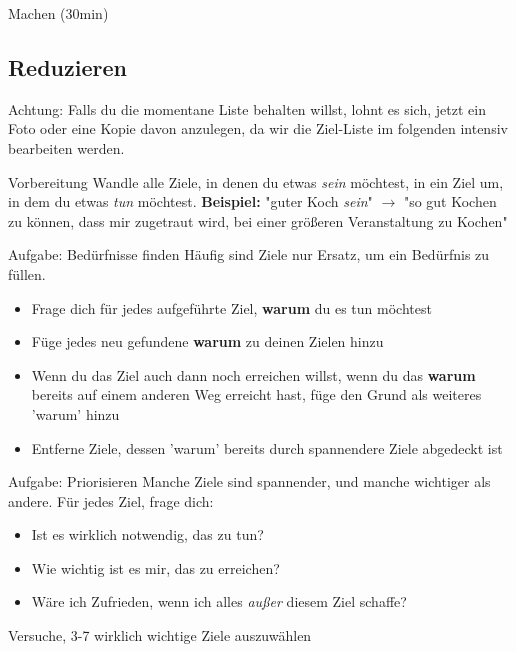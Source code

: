 \addtocounter{framenumber}{1}
\begin{frame}[standout]
    Machen (30min)
\end{frame}


\subsection{Reduzieren}

\addtocounter{framenumber}{1}
\begin{frame}[standout]
    \LARGE
    Achtung: Falls du die momentane Liste behalten willst, lohnt es sich, jetzt
    ein Foto oder eine Kopie davon anzulegen, da wir die Ziel-Liste im
    folgenden intensiv bearbeiten werden.
\end{frame}

\begin{frame}[c]{Vorbereitung}
    \Large
    Wandle alle Ziele, in denen du etwas {\em sein} möchtest, in ein Ziel um,
    in dem du etwas {\em tun} möchtest. \newline \newline \pause
    \textbf{Beispiel:} "guter Koch {\em sein}" $\rightarrow$ "so gut Kochen zu
    können, dass mir zugetraut wird, bei einer größeren Veranstaltung zu Kochen"
\end{frame}

\begin{frame}[c]{Aufgabe: Bedürfnisse finden}
    \normalsize
    Häufig sind Ziele nur Ersatz, um ein Bedürfnis zu füllen.
    \begin{itemize}[<+(1)->]
        \item Frage dich für jedes aufgeführte Ziel, \textbf{warum} du es tun möchtest
        \item Füge jedes neu gefundene \textbf{warum} zu deinen Zielen hinzu
        \item Wenn du das Ziel auch dann noch erreichen willst, wenn du das
            \textbf{warum} bereits auf einem anderen Weg erreicht hast, füge
            den Grund als weiteres 'warum' hinzu
        \item Entferne Ziele, dessen 'warum' bereits durch spannendere Ziele abgedeckt ist
    \end{itemize}
\end{frame}


\begin{frame}[c]{Aufgabe: Priorisieren}
    Manche Ziele sind spannender, und manche wichtiger als andere. Für jedes
    Ziel, frage dich:
    \begin{itemize}[<+(1)->]
        \item Ist es wirklich notwendig, das zu tun?
        \item Wie wichtig ist es mir, das zu erreichen?
        \item Wäre ich Zufrieden, wenn ich alles {\em außer} diesem Ziel schaffe?
    \end{itemize} \pause
    Versuche, 3-7 wirklich wichtige Ziele auszuwählen
\end{frame}
